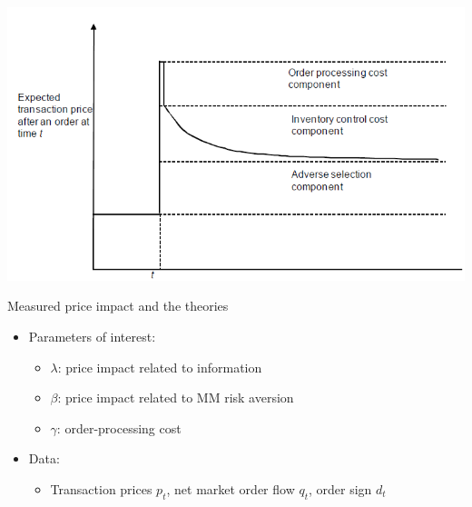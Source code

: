 \documentclass[english,10pt
,aspectratio=169
]{beamer}
\begin{document}



\begin{frame}{}
	\includegraphics[width=0.8\linewidth]{pics/PriceDiscovery_Image}
\end{frame}


\begin{frame}{Measured price impact and the theories}
	\begin{itemize}
		\item Parameters of interest:
		\begin{itemize}
			\item $\lambda$: price impact related to information
			\item $\beta$: price impact related to MM risk aversion
			\item $\gamma$: order-processing cost
		\end{itemize}
		\item Data:
		\begin{itemize}
			\item Transaction prices $p_t$, net market order flow $q_t$, order sign $d_t$
		\end{itemize}
	\end{itemize}
\end{frame}
\end{document}
